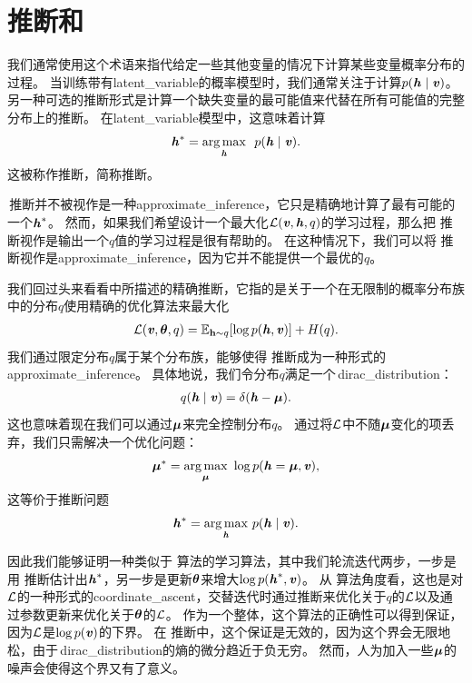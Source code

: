 \section{推断和}
\label{sec:map_inference_and_sparse_coding}


我们通常使用这个术语来指代给定一些其他变量的情况下计算某些变量概率分布的过程。
当训练带有\gls{latent_variable}的概率模型时，我们通常关注于计算$p(\boldsymbol{\mathit{h}}\mid\boldsymbol{\mathit{v}})$。
另一种可选的推断形式是计算一个缺失变量的最可能值来代替在所有可能值的完整分布上的推断。
在\gls{latent_variable}模型中，这意味着计算
\begin{align}
\boldsymbol{\mathit{h}}^* = \underset{\boldsymbol{\mathit{h}}}{\arg\max} \ \  p(\boldsymbol{\mathit{h}}\mid\boldsymbol{\mathit{v}}).
\end{align}
这被称作推断，简称推断。



\,推断并不被视作是一种\gls{approximate_inference}，它只是精确地计算了最有可能的一个$\boldsymbol{\mathit{h}}^*$。
然而，如果我们希望设计一个最大化$\mathcal{L}(\boldsymbol{\mathit{v}},\boldsymbol{\mathit{h}},q)$的学习过程，那么把\,\,推断视作是输出一个$q$值的学习过程是很有帮助的。
在这种情况下，我们可以将\,\,推断视作是\gls{approximate_inference}，因为它并不能提供一个最优的$q$。



我们回过头来看看中所描述的精确推断，它指的是关于一个在无限制的概率分布族中的分布$q$使用精确的优化算法来最大化
\begin{align}
\mathcal{L}(\boldsymbol{\mathit{v}},{\boldsymbol{\theta}},q)
 = \mathbb{E}_{\mathbf{h}\sim q}[\log p(\boldsymbol{\mathit{h}} , \boldsymbol{\mathit{v}})] + H(q).
\end{align}
我们通过限定分布$q$属于某个分布族，能够使得\,\,推断成为一种形式的\gls{approximate_inference}。
具体地说，我们令分布$q$满足一个\,\gls{dirac_distribution}：
\begin{align}
q(\boldsymbol{\mathit{h}}\mid\boldsymbol{\mathit{v}}) = \delta(\boldsymbol{\mathit{h}} - {\boldsymbol{\mu}}).
\end{align}
这也意味着现在我们可以通过$\boldsymbol{\mu}$来完全控制分布$q$。
通过将$\mathcal{L}$中不随$\boldsymbol{\mu}$变化的项丢弃，我们只需解决一个优化问题：
\begin{align}
\boldsymbol{\mu}^*  =  \underset{\boldsymbol{\mu}}{\arg\max}\ \log p(\boldsymbol{\mathit{h}} = \boldsymbol{\mu},\boldsymbol{\mathit{v}}),
\end{align}
这等价于推断问题
\begin{align}
\boldsymbol{\mathit{h}}^* = \underset{\boldsymbol{\mathit{h}}}{\arg\max}\  p(\boldsymbol{\mathit{h}}\mid\boldsymbol{\mathit{v}}).
\end{align}




因此我们能够证明一种类似于\,\,算法的学习算法，其中我们轮流迭代两步，一步是用\,\,推断估计出$\boldsymbol{\mathit{h}}^*$，另一步是更新$\boldsymbol{\theta}$来增大$\log p(\boldsymbol{\mathit{h}}^*,\boldsymbol{\mathit{v}})$。
从\,\,算法角度看，这也是对$\mathcal{L}$的一种形式的\gls{coordinate_ascent}，交替迭代时通过推断来优化关于$q$的$\mathcal{L}$以及通过参数更新来优化关于$\boldsymbol{\theta}$的$\mathcal{L}$。
作为一个整体，这个算法的正确性可以得到保证，因为$\mathcal{L}$是$\log p(\boldsymbol{\mathit{v}})$的下界。
在\,\,推断中，这个保证是无效的，因为这个界会无限地松，由于\,\gls{dirac_distribution}的熵的微分趋近于负无穷。
然而，人为加入一些$\boldsymbol{\mu}$的噪声会使得这个界又有了意义。


